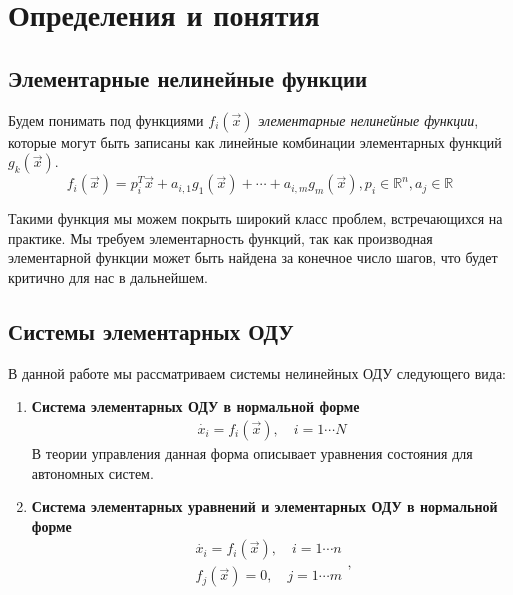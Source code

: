 
\section{Определения и понятия} \label{sec:definitions}

\subsection{Элементарные нелинейные функции}

\begin{definition}
    Будем понимать под функциями $f_i(\vec x)$ \textit{элементарные нелинейные функции}, которые могут быть записаны как линейные комбинации элементарных функций $g_k(\vec x)$. 
    \begin{equation}
        f_i(\vec x) = p_i^T \vec x + a_{i,1} g_1(\vec x) + \cdots + a_{i,m} g_m(\vec x), p_i \in \mathbb{R}^n, a_j \in \mathbb{R}
    \end{equation}
\end{definition}

Такими функция мы можем покрыть широкий класс проблем, встречающихся на практике. Мы требуем элементарность функций, так как производная элементарной функции может быть найдена за конечное число шагов, что будет критично для нас в дальнейшем.

\subsection{Системы элементарных ОДУ}

В данной работе мы рассматриваем системы нелинейных ОДУ следующего вида:

\begin{enumerate}
    \item \textbf{Система элементарных ОДУ в нормальной форме}
    \begin{equation} \label{eq:ODE-norm-system}
        \begin{array}{cc}
             \dot{x_i} = f_i(\vec x),\quad i = 1 \cdots N
        \end{array}
    \end{equation}
    В теории управления данная форма описывает уравнения состояния для автономных систем.
    
    \item \textbf{Система элементарных уравнений и элементарных ОДУ в нормальной форме}
    \begin{equation} \label{eq:ADE-system}
        \begin{array}{lcl}
             \dot{x_i} = f_i(\vec x), \quad i = 1 \cdots n  \\
             f_j(\vec x) = 0, \quad j = 1 \cdots m
        \end{array},
    \end{equation}
\end{enumerate} 

